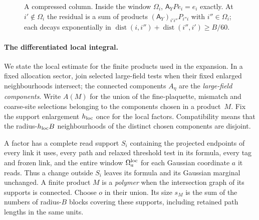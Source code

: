 \begin{figure}[ht]
\centering
{}
\caption{A compressed column. Inside the window $\Omega_i$, $\mathsf A_YPe_i=e_i$ exactly. At $i'\notin\Omega_i$ the residual is a sum of products $(\mathsf A_Y)_{i'i''}P_{i''i}$ with $i''\in\Omega_i$; each decays exponentially in $\operatorname{dist}(i,i'')+\operatorname{dist}(i'',i')\ge B/60$.}\label{fig:B-window}
\end{figure}

\paragraph{The differentiated local integral.}
We state the local estimate for the finite products used in the expansion. In a fixed allocation sector, join selected large-field tests when their fixed enlarged neighbourhoods intersect; the connected components $A_\eta$ are the \emph{large-field components}. Write $A(M)$ for the union of the fine-plaquette, mismatch and coarse-site selections belonging to the components chosen in a product~$M$. Fix the support enlargement $h_{\rm loc}$ once for the local factors. Compatibility means that the radius-$h_{\rm loc}B$ neighbourhoods of the distinct chosen components are disjoint.

A factor has a complete read support $S_i$ containing the projected endpoints of every link it uses, every path and relaxed threshold test in its formula, every tag and frozen link, and the entire window $\Omega_a^{\rm loc}$ for each Gaussian coordinate $a$ it reads. Thus a change outside $S_i$ leaves its formula and its Gaussian marginal unchanged. A finite product $M$ is a \emph{polymer} when the intersection graph of its supports is connected. Choose $o$ in their union. Its size $s_M$ is the sum of the numbers of radius-$B$ blocks covering these supports, including retained path lengths in the same units.

